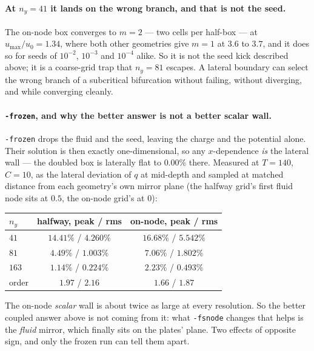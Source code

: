\documentclass[11pt,a4paper]{article}
\newcommand{\code}[1]{\texttt{\small #1}}
\begin{document}
\paragraph{At $n_y=41$ it lands on the wrong branch, and that is not the seed.}
The on-node box converges to $m=2$ --- two cells per half-box --- at
$u_{\max}/u_0=1.34$, where both other geometries give $m=1$ at $3.6$ to $3.7$,
and it does so for seeds of $10^{-2}$, $10^{-3}$ and $10^{-4}$ alike. So it is
not the seed kick described above; it is a coarse-grid trap that $n_y=81$
escapes. A lateral boundary can select the wrong branch of a subcritical
bifurcation without failing, without diverging, and while converging cleanly.

\paragraph{\texttt{-frozen}, and why the better answer is not a better scalar
wall.} \code{-frozen} drops the fluid and the seed, leaving the charge and the
potential alone. Their solution is then exactly one-dimensional, so any
$x$-dependence \emph{is} the lateral wall --- the doubled box is laterally flat
to $0.00\%$ there. Measured at $T=140$, $C=10$, as the lateral deviation of $q$
at mid-depth and sampled at matched distance from each geometry's own mirror
plane (the halfway grid's first fluid node sits at $0.5$, the on-node grid's at
$0$):

\begin{center}\small
\begin{tabular}{lcc}
\toprule
$n_y$ & halfway, peak / rms & on-node, peak / rms \\
\midrule
$41$  & $14.41\%$ / $4.260\%$ & $16.68\%$ / $5.542\%$ \\
$81$  & $4.49\%$ / $1.003\%$  & $7.06\%$ / $1.802\%$ \\
$163$ & $1.14\%$ / $0.224\%$  & $2.23\%$ / $0.493\%$ \\
\midrule
order & $1.97$ / $2.16$ & $1.66$ / $1.87$ \\
\bottomrule
\end{tabular}
\end{center}

\noindent The on-node \emph{scalar} wall is about twice as large at every
resolution. So the better coupled answer above is not coming from it: what
\code{-fsnode} changes that helps is the \emph{fluid} mirror, which finally sits
on the plates' plane. Two effects of opposite sign, and only the frozen run can
tell them apart.
\end{document}
